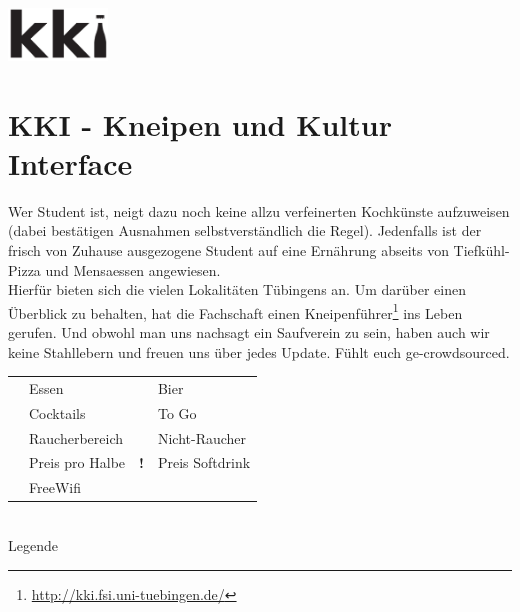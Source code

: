 \newcommand{\no}     {\faIcon{times}}
\newcommand{\yes}    {\faIcon{check}}
\newcommand{\unknown}{\faIcon{question}}

\newcommand{\is}[1]{\ifcsvstrcmp{#1}{}{n.a.}{#1}}

\newcommand{\has}[1]{\ifcsvstrcmp{#1}{0}{\no}{\ifcsvstrcmp{#1}{1}{\yes}{\unknown}}}

\newcommand{\features}[7]{
    \begin{tabular}{c|c|c|c|c|c|c}
        \renewcommand{\arraystretch}{2.5}
        \faIcon{utensils}       & \faIcon{beer}         & \faIcon{cocktail} & \faIcon{wifi}         & 
        \faIcon{shopping-bag}   & \faIcon{smoking}      & \faIcon{smoking-ban}              \\ \hline
        #1 & #2 & #3 & #4 & #5 & #6 & #7
    \end{tabular}
}

\newcommand{\kneipenCSV}{kki/dump.csv}

\centerline{\includegraphics[width=100px]{kki/kki-small.pdf}}

\section*{KKI - Kneipen und Kultur Interface}

Wer Student ist, neigt dazu noch keine allzu verfeinerten Kochkünste aufzuweisen (dabei bestätigen Ausnahmen selbstverständlich die Regel). Jedenfalls ist der frisch von Zuhause ausgezogene Student auf eine Ernährung abseits von Tiefkühl-Pizza und Mensaessen angewiesen.\\
Hierfür bieten sich die vielen Lokalitäten Tübingens an. Um darüber einen Überblick zu behalten, hat die Fachschaft einen Kneipenführer\footnote{\url{http://kki.fsi.uni-tuebingen.de/}} ins Leben gerufen. Und obwohl man uns nachsagt ein Saufverein zu sein, haben auch wir keine Stahllebern und freuen uns über jedes Update. Fühlt euch ge-crowdsourced.

\begin{center}
	\noindent
	\begin{tabular}{cl|cl}
		\faUtensils     & Essen          & \faBeer           & Bier     \\
		\faCocktail     & Cocktails      & \faShoppingBag    & To Go      \\
		\faSmoking      & Raucherbereich & \faSmokingBan     & Nicht-Raucher \\
		\faBeer\faEuroSign               & Preis pro Halbe   & 
		\textbf{!}\faBeer\faEuroSign     & Preis Softdrink\\
		\faWifi           & FreeWifi     &&\\
	\end{tabular}\\
	Legende
\end{center}


